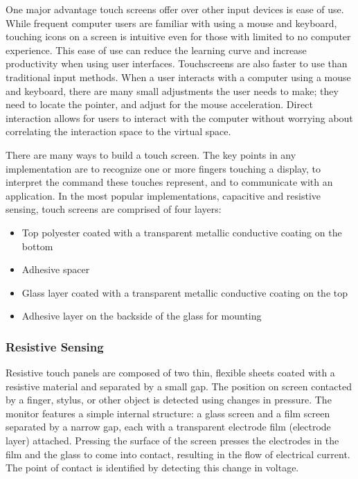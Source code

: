 \documentclass[11pt]{report}
\begin{document}
One major advantage touch screens offer over other input devices is ease of use.
While frequent computer users are familiar with using a mouse and keyboard, touching icons on a screen is intuitive even for those with limited to no computer experience.
This ease of use can reduce the learning curve and increase productivity when using user interfaces.
Touchscreens are also faster to use than traditional input methods.
When a user interacts with a computer using a mouse and keyboard, there are many small adjustments the user needs to make; they need to locate the pointer, and adjust for the mouse acceleration.
Direct interaction allows for users to interact with the computer without worrying about correlating the interaction space to the virtual space. 

There are many ways to build a touch screen.
The key points in any implementation are to recognize one or more fingers touching a display, to interpret the command these touches represent, and to communicate with an application.
In the most popular implementations, capacitive and resistive sensing, touch screens are comprised of four layers:

\begin{itemize}
\item Top polyester coated with a transparent metallic conductive coating on the bottom
\item Adhesive spacer
\item Glass layer coated with a transparent metallic conductive coating on the top
\item Adhesive layer on the backside of the glass for mounting
\end{itemize}

\subsubsection{Resistive Sensing}
Resistive touch panels are composed of two thin, flexible sheets coated with a resistive material and separated by a small gap.
The position on screen contacted by a finger, stylus, or other object is detected using changes in pressure. 
The monitor features a simple internal structure: a glass screen and a film screen separated by a narrow gap, each with a transparent electrode film (electrode layer) attached. 
Pressing the surface of the screen presses the electrodes in the film and the glass to come into contact, resulting in the flow of electrical current. 
The point of contact is identified by detecting this change in voltage.
\end{document}
